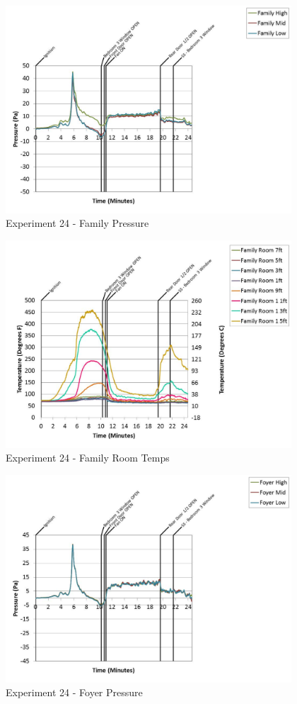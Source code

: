 \documentclass{article}
\begin{document}
\begin{appendices}
	\begin{figure}[h!]
		\centering
		\includegraphics[height=3.05in]{0_Images/Results_Charts/Exp_24_Charts/FamilyPressure.pdf}
		\caption{Experiment 24 - Family Pressure}
	\end{figure}
 
	\clearpage

	\begin{figure}[h!]
		\centering
		\includegraphics[height=3.05in]{0_Images/Results_Charts/Exp_24_Charts/FamilyRoomTemps.pdf}
		\caption{Experiment 24 - Family Room Temps}
	\end{figure}
 

	\begin{figure}[h!]
		\centering
		\includegraphics[height=3.05in]{0_Images/Results_Charts/Exp_24_Charts/FoyerPressure.pdf}
		\caption{Experiment 24 - Foyer Pressure}
	\end{figure}
 

\end{appendices}
\end{document}
